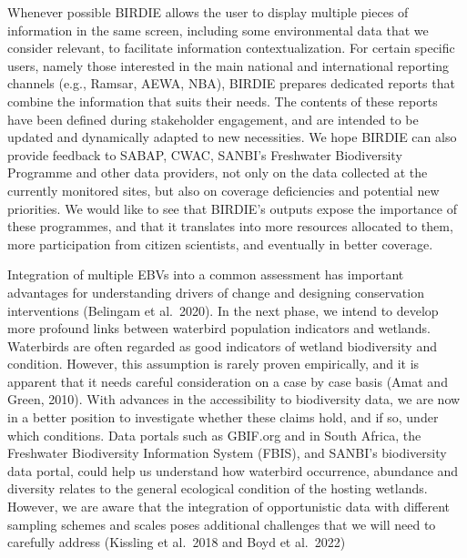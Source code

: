 \documentclass[utf8]{frontiersSCNS}
\begin{document}
Whenever possible BIRDIE allows the user to display multiple pieces of
information in the same screen, including some environmental data that
we consider relevant, to facilitate information contextualization. For
certain specific users, namely those interested in the main national and
international reporting channels (e.g., Ramsar, AEWA, NBA), BIRDIE
prepares dedicated reports that combine the information that suits their
needs. The contents of these reports have been defined during
stakeholder engagement, and are intended to be updated and dynamically
adapted to new necessities. We hope BIRDIE can also provide feedback to
SABAP, CWAC, SANBI's Freshwater Biodiversity Programme and other data
providers, not only on the data collected at the currently monitored
sites, but also on coverage deficiencies and potential new priorities.
We would like to see that BIRDIE's outputs expose the importance of
these programmes, and that it translates into more resources allocated
to them, more participation from citizen scientists, and eventually in
better coverage.

Integration of multiple EBVs into a common assessment has important
advantages for understanding drivers of change and designing
conservation interventions (Belingam et al.~2020). In the next phase, we
intend to develop more profound links between waterbird population
indicators and wetlands. Waterbirds are often regarded as good
indicators of wetland biodiversity and condition. However, this
assumption is rarely proven empirically, and it is apparent that it
needs careful consideration on a case by case basis (Amat and Green,
2010). With advances in the accessibility to biodiversity data, we are
now in a better position to investigate whether these claims hold, and
if so, under which conditions. Data portals such as GBIF.org and in
South Africa, the Freshwater Biodiversity Information System (FBIS), and
SANBI's biodiversity data portal, could help us understand how waterbird
occurrence, abundance and diversity relates to the general ecological
condition of the hosting wetlands. However, we are aware that the
integration of opportunistic data with different sampling schemes and
scales poses additional challenges that we will need to carefully
address (Kissling et al.~2018 and Boyd et al.~2022)
\end{document}
